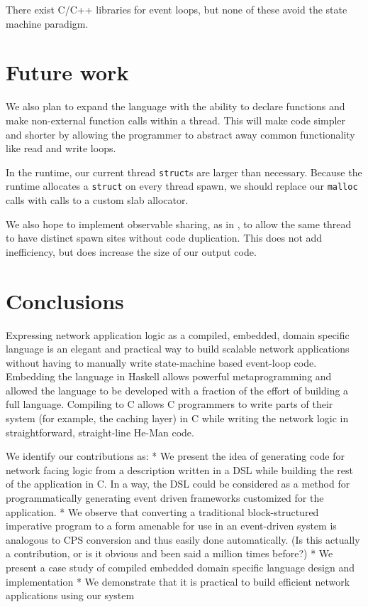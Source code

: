 \documentclass[preprint]{sigplanconf}
\renewcommand{\t}{\texttt}
\begin{document}
There exist C/C++ libraries for event loops\cite{libevent}, but none of these
avoid the state machine paradigm.

\section{Future work}

We also plan to expand the language with the ability to declare functions and
make non-external function calls within a thread. This will make code simpler
and shorter by allowing the programmer to abstract away common functionality
like read and write loops.

In the runtime, our current thread \t{struct}s are larger than necessary.
Because the runtime allocates a \t{struct} on every thread spawn, we should
replace our \t{malloc} calls with calls to a custom slab allocator.

We also hope to implement observable sharing, as in \cite{Gill}, to allow the
same thread to have distinct spawn sites without code duplication. This does not
add inefficiency, but does increase the size of our output code. 

\section{Conclusions}
Expressing network application logic as a compiled, embedded, domain
specific language is an elegant and practical way to build scalable
network applications without having to manually write state-machine
based event-loop code. Embedding the language in Haskell allows
powerful metaprogramming and allowed the language to be developed with
a fraction of the effort of building a full language. Compiling to C
allows C programmers to write parts of their system (for example, the
caching layer) in C while writing the network logic in
straightforward, straight-line He-Man code.


We identify our contributions as:
* We present the idea of generating code for network facing logic from a
description written in a DSL while building the rest of the application in
C. In a way, the DSL could be considered as a method for programmatically
generating event driven frameworks customized for the application.
* We observe that converting a traditional block-structured imperative
program to a form amenable for use in an event-driven system is analogous
to CPS conversion and thus easily done automatically. (Is this actually a
contribution, or is it obvious and been said a million times before?)
* We present a case study of compiled embedded domain specific language
design and implementation
* We demonstrate that it is practical to build efficient network
applications using our system

{}

\end{document}
